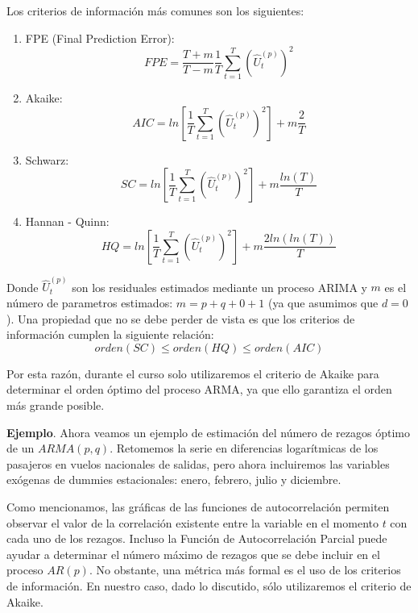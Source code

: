 \documentclass[
]{book}
\begin{document}
Los criterios de información más comunes son los siguientes:

\begin{enumerate}
\def\labelenumi{\arabic{enumi}.}
\item
  FPE (Final Prediction Error):
  \begin{equation}
   FPE = \frac{T+m}{T-m}\frac{1}{T}\sum_{t=1}^{T} \left( \hat{U}_t^{(p)} \right) ^2
  \end{equation}
\item
  Akaike:
  \begin{equation}
   AIC = ln \left[ \frac{1}{T} \sum_{t=1}^{T} \left( \hat{U}_t^{(p)} \right) ^2 \right] + m \frac{2}{T}
  \end{equation}
\item
  Schwarz:
  \begin{equation}
   SC = ln \left[ \frac{1}{T} \sum_{t=1}^{T} \left( \hat{U}_t^{(p)} \right) ^2 \right] + m \frac{ln(T)}{T}
  \end{equation}
\item
  Hannan - Quinn:
  \begin{equation}
   HQ = ln \left[ \frac{1}{T} \sum_{t=1}^{T} \left( \hat{U}_t^{(p)} \right) ^2 \right] + m \frac{2 ln(ln(T))}{T}
  \end{equation}
\end{enumerate}

Donde \(\hat{U}_t^{(p)}\) son los residuales estimados mediante un proceso ARIMA y \(m\) es el número de parametros estimados: \(m = p + q + 0 + 1\) (ya que asumimos que \(d = 0\)). Una propiedad que no se debe perder de vista es que los criterios de información cumplen la siguiente relación:
\begin{equation}
    orden(SC) \leq orden(HQ) \leq orden(AIC)
\end{equation}

Por esta razón, durante el curso solo utilizaremos el criterio de Akaike para determinar el orden óptimo del proceso ARMA, ya que ello garantiza el orden más grande posible.

\textbf{Ejemplo}. Ahora veamos un ejemplo de estimación del número de rezagos óptimo de un \(ARMA(p, q)\). Retomemos la serie en diferencias logarítmicas de los pasajeros en vuelos nacionales de salidas, pero ahora incluiremos las variables exógenas de dummies estacionales: enero, febrero, julio y diciembre.

Como mencionamos, las gráficas de las funciones de autocorrelación permiten observar el valor de la correlación existente entre la variable en el momento \(t\) con cada uno de los rezagos. Incluso la Función de Autocorrelación Parcial puede ayudar a determinar el número máximo de rezagos que se debe incluir en el proceso \(AR(p)\). No obstante, una métrica más formal es el uso de los criterios de información. En nuestro caso, dado lo discutido, sólo utilizaremos el criterio de Akaike.
\end{document}

